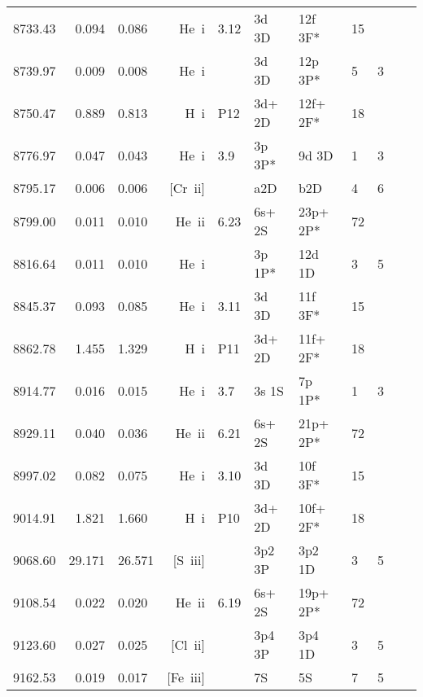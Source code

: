 \begin{longtable}{lrlrlllllll}
 8733.43 &   0.094 &   0.086 & He~{\sc i}       & 3.12       & 3d 3D      & 12f 3F*    &         15 &             \\
 8739.97 &   0.009 &   0.008 & He~{\sc i}       &            & 3d 3D      & 12p 3P*    &          5 &        3    \\
 8750.47 &   0.889 &   0.813 & H~{\sc i}        & P12        & 3d+ 2D     & 12f+ 2F*   &         18 &             \\
 8776.97 &   0.047 &   0.043 & He~{\sc i}       & 3.9        & 3p 3P*     & 9d 3D      &          1 &        3    \\
 8795.17 &   0.006 &   0.006 & [Cr~{\sc ii}]    &            & a2D        & b2D        &          4 &        6    \\
 8799.00 &   0.011 &   0.010 & He~{\sc ii}      & 6.23       & 6s+ 2S     & 23p+ 2P*   &         72 &             \\
 8816.64 &   0.011 &   0.010 & He~{\sc i}       &            & 3p  1P*    & 12d  1D    &          3 &        5    \\
 8845.37 &   0.093 &   0.085 & He~{\sc i}       & 3.11       & 3d 3D      & 11f 3F*    &         15 &             \\
 8862.78 &   1.455 &   1.329 & H~{\sc i}        & P11        & 3d+ 2D     & 11f+ 2F*   &         18 &             \\
 8914.77 &   0.016 &   0.015 & He~{\sc i}       & 3.7        & 3s 1S      & 7p 1P*     &          1 &        3    \\
 8929.11 &   0.040 &   0.036 & He~{\sc ii}      & 6.21       & 6s+ 2S     & 21p+ 2P*   &         72 &             \\
 8997.02 &   0.082 &   0.075 & He~{\sc i}       & 3.10       & 3d 3D      & 10f 3F*    &         15 &             \\
 9014.91 &   1.821 &   1.660 & H~{\sc i}        & P10        & 3d+ 2D     & 10f+ 2F*   &         18 &             \\
 9068.60 &  29.171 &  26.571 & [S~{\sc iii}]    &            & 3p2 3P     & 3p2 1D     &          3 &        5    \\
 9108.54 &   0.022 &   0.020 & He~{\sc ii}      & 6.19       & 6s+ 2S     & 19p+ 2P*   &         72 &             \\
 9123.60 &   0.027 &   0.025 & [Cl~{\sc ii}]    &            & 3p4 3P     & 3p4 1D     &          3 &        5    \\
 9162.53 &   0.019 &   0.017 & [Fe~{\sc iii}]   &            & 7S         & 5S         &          7 &        5    \\

\end{longtable}
